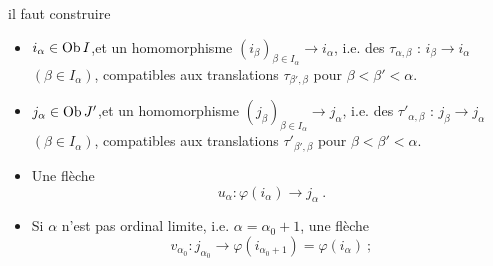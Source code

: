 
il faut construire

\begin{itemize}[leftmargin=*]
\item[1)] $i_\alpha\in\operatorname{Ob} I$,\quad et un homomorphisme $(i_\beta)_{\beta\in I_\alpha}\longrightarrow i_\alpha$, i.e. des $\tau_{\alpha,\beta}$ : $i_\beta\longrightarrow i_\alpha$ $(\beta\in I_\alpha)$, compatibles aux translations $\tau_{\beta',\beta}$ pour $\beta<\beta'<\alpha$.
\item[2)] $j_\alpha\in\operatorname{Ob} J'$,\quad et un homomorphisme $(j_\beta)_{\beta\in I_\alpha}\longrightarrow j_\alpha$, i.e. des $\tau'_{\alpha,\beta}$ : $j_\beta\longrightarrow j_\alpha$ $(\beta\in I_\alpha)$, compatibles aux translations $\tau'_{\beta',\beta}$ pour $\beta<\beta'<\alpha$.
\item[3)] Une flèche
\[
u_\alpha:\varphi(i_\alpha)\longrightarrow j_\alpha\ .
\]
\item[4)] Si $\alpha$ n'est pas ordinal limite, i.e. $\alpha=\alpha_0+1$, une flèche
\[
v_{\alpha_0}:j_{\alpha_0}\longrightarrow\varphi(i_{\alpha_0+1})=\varphi(i_\alpha)\ ;
\]
\end{itemize}

